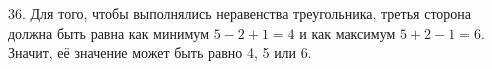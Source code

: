 36. Для того, чтобы выполнялись неравенства треугольника, третья сторона должна быть равна как минимум $5-2+1=4$ и как максимум $5+2-1=6.$ Значит, её значение может быть равно 4, 5 или 6.\\

